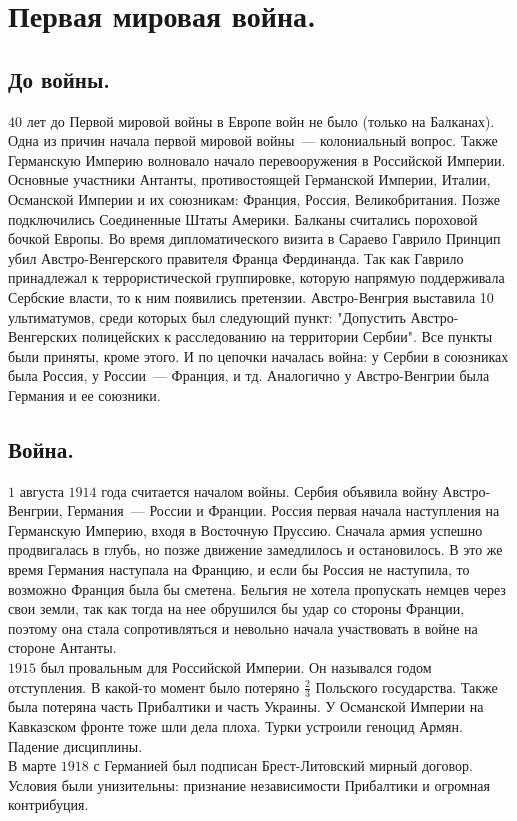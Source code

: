 \documentclass[12pt]{article}
\begin{document}
	\tableofcontents
	\setcounter{tocdepth}{3}
	\newpage
	\section{Первая мировая война.}
	\subsection{До войны.}
	$40$ лет до Первой мировой войны в Европе войн не было (только на Балканах). Одна из причин начала первой мировой войны~--- колониальный вопрос. Также Германскую Империю волновало начало перевооружения в Российской Империи. Основные участники Антанты, противостоящей Германской Империи, Италии, Османской Империи и их союзникам: Франция, Россия, Великобритания. Позже подключились Соединенные Штаты Америки. Балканы считались пороховой бочкой Европы. Во время дипломатического визита в Сараево Гаврило Принцип убил Австро-Венгерского правителя Франца Фердинанда. Так как Гаврило принадлежал к террористической группировке, которую напрямую поддерживала Сербские власти, то к ним появились претензии. Австро-Венгрия выставила 10 ультиматумов, среди которых был следующий пункт: "Допустить Австро-Венгерских полицейских к расследованию на территории Сербии". Все пункты были приняты, кроме этого. И по цепочки началась война: у Сербии в союзниках была Россия, у России~--- Франция, и тд. Аналогично у Австро-Венгрии была Германия и ее союзники.
	\subsection{Война.}
	$1$ августа $1914$ года считается началом войны. Сербия объявила войну Австро-Венгрии, Германия~--- России и Франции. Россия первая начала наступления на Германскую Империю, входя в Восточную Пруссию. Сначала армия успешно продвигалась в глубь, но позже движение замедлилось и остановилось. В это же время Германия наступала на Францию, и если бы Россия не наступила, то возможно Франция была бы сметена. Бельгия не хотела пропускать немцев через свои земли, так как тогда на нее обрушился бы удар со стороны Франции, поэтому она стала сопротивляться и невольно начала участвовать в войне на стороне Антанты. \\
	$1915$ был провальным для Российской Империи. Он назывался годом отступления. В какой-то момент было потеряно $\frac{2}{3}$ Польского государства. Также была потеряна часть Прибалтики и часть Украины. У Османской Империи на Кавказском фронте тоже шли дела плоха. Турки устроили геноцид Армян. Падение дисциплины. \\
	В марте $1918$ с Германией был подписан Брест-Литовский мирный договор. Условия были унизительны: признание независимости Прибалтики и огромная контрибуция.
\end{document}
